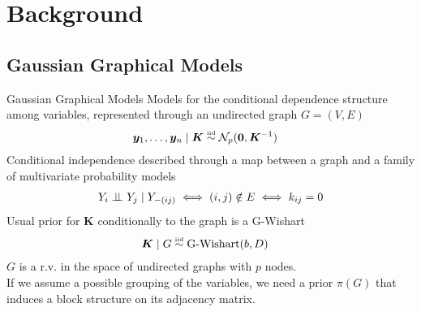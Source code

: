 

\section{Background}

\subsection{Gaussian Graphical Models}
\begin{frame}{Gaussian Graphical Models}
    Models for the \alert{conditional dependence structure} among variables, represented through an undirected graph $G=(V,E)$
    \begin{align*}
    \bm{y}_{1}, \ldots, \bm{y}_{n} \mid \bm{K} &\overset{\text{\tiny{iid}}}{\sim} \mathcal{N}_{p}(\bm{0},\bm{K}^{-1})
    \end{align*}
Conditional independence described through a \alert{map} between a \alert{graph} and a family of multivariate \alert{probability models}
\begin{align*}
Y_{i}\perp \!\!\! \perp Y_{j} \mid Y_{-(ij)} \iff (i,j) \notin E \iff k_{ij}=0
\end{align*}
Usual prior for $\bm{K}$ conditionally to the graph is a G-Wishart
\begin{align*}
    \bm{K} \mid G &\overset{\text{\tiny{iid}}}{\sim} \operatorname{G-Wishart}(b,D)
\end{align*}
$G$ is a r.v. in the space of undirected graphs with $p$ nodes.\\
If we assume a possible \alert{grouping} of the variables, we need a prior $\pi(G)$ that induces a \alert{block structure on its adjacency matrix}.
\end{frame}



 

